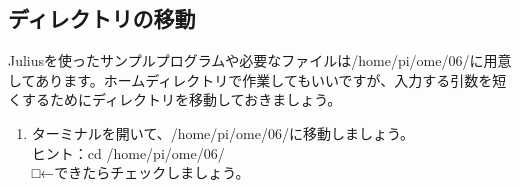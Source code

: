 \subsection{ディレクトリの移動}
Juliusを使ったサンプルプログラムや必要なファイルは/home/pi/ome/06/に用意してあります。ホームディレクトリで作業してもいいですが、入力する引数を短くするためにディレクトリを移動しておきましょう。\\

\begin{tcolorbox}[title=\useOmetoi]
\begin{enumerate}
\item ターミナルを開いて、/home/pi/ome/06/に移動しましょう。\\ヒント：cd /home/pi/ome/06/\\□←できたらチェックしましょう。
\end{enumerate}
\end{tcolorbox}